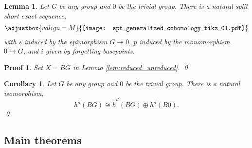 \documentclass[sort&compress]{elsarticle}
\theoremstyle{theoremstyle}
\newtheorem{lem}[nul]{Lemma}
\newtheorem{cor}[nul]{Corollary}
\theoremstyle{framedtheoremstyle}
\theoremstyle{definitionstyle}
\theoremstyle{definitionstyle}
\theoremstyle{definitionstyle}
\theoremstyle{definitionstyle}
\theoremstyle{nameddefinitionstyle}
\theoremstyle{framednameddefinitionstyle}
\theoremstyle{proofstyle}
\newtheorem{pf}{Proof}
\theoremstyle{definitionstyle}
\newcommand{\oneone}{\hookrightarrow}
\newcommand{\onto}{\twoheadrightarrow}
\newcommand{\isomorphic}{\cong}
\newcommand{\paren}[1]{\left( #1 \right)}
\begin{document}
\begin{appendices}

\begin{lem}
Let $G$ be any group and $0$ be the trivial group. There is a natural split short exact sequence,
\begin{eqnarray}
\adjustbox{valign=M}{\texttt{[image: spt\_generalized\_cohomology\_tikz\_01.pdf]}}
\end{eqnarray}
with $s$ induced by the epimorphism $G \onto 0$, $p$ induced by the monomorphism $0 \oneone G$, and $i$ given by forgetting basepoints. \label{lem:relationship_reduced_unreduced_generalized_cohomology_theories}
\end{lem}

\begin{pf}%
Set $X=BG$ in Lemma \ref{lem:reduced_unreduced}.
\qed\end{pf}




\begin{cor}
Let $G$ be any group and $0$ be the trivial group. There is a natural isomorphism,
\begin{equation}
h^d(BG) \isomorphic \tilde h^d(BG) \oplus h^d(B 0).
\end{equation}\qed\label{cor:relationship_reduced_unreduced_generalized_cohomology_theories}
\end{cor}







\subsection{Main theorems\label{subapp:main_proofs}}


\end{appendices}
\end{document}
